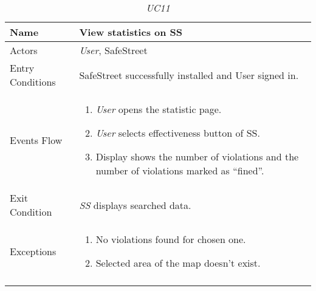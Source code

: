 \documentclass[../../../RASD.tex]{subfiles}
\begin{document}
    \begin{center}
        \begin{longtable}{| p{.35\linewidth} | p{.65\linewidth} |}
            \hline
            \textbf{Name} & \textbf{View statistics on SS}\\ \hline
            Actors & \textit{User}, SafeStreet\\ \hline
            Entry Conditions & SafeStreet successfully installed and User signed in.\\ \hline
            Events Flow &
            \begin{enumerate}
                \item \textit{User} opens the statistic page.
                \item \textit{User} selects effectiveness button of SS.
                \item  Display shows the number of violations and the number of violations marked as “fined”.
            \end{enumerate}
            \\ \hline
            Exit Condition & \textit{SS} displays searched data.\\ \hline
            Exceptions &
            \begin{enumerate}
                \item No violations found for chosen one.
                \item Selected area of the map doesn’t exist.
            \end{enumerate}
            \\
            \hline
            \caption[\textit{Use Case 11}]{\textit{UC11}}
        \end{longtable}
    \end{center}
    \newpage
\end{document}
